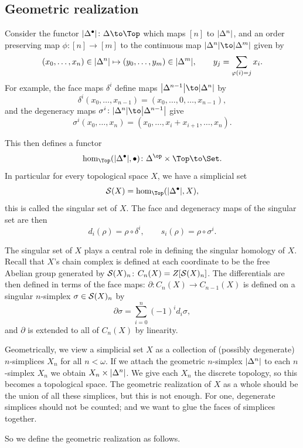 \subsection{Geometric realization}

Consider the functor $\abs{\Delta^\bul}\colon\Delta\to\Top$ which maps $[n]$ to $\abs{\Delta^n}$, and an order preserving map $\phi\colon[n]\to[m]$ to the continuous map
$\abs{\Delta^n}\to\abs{\Delta^m}$ given by
$$ (x_0,\dots,x_n)\in\abs{\Delta^n} \mapsto (y_0,\dots,y_m)\in\abs{\Delta^m},\qquad y_j = \sum_{\phi(i)=j}x_i . $$
For example, the face maps $\delta^i$ define maps $\abs{\Delta^{n-1}}\to\abs{\Delta^n}$ by
$$ \delta^i(x_0,\dots,x_{n-1}) = (x_0,\dots,0,\dots,x_{n-1}), $$
and the degeneracy maps $\sigma^i\colon\abs{\Delta^n}\to\abs{\Delta^{n-1}}$ give
$$ \sigma^i(x_0,\dots,x_n) = (x_0,\dots,x_i+x_{i+1},\dots,x_n) . $$

This then defines a functor
$$ \hom_\Top(\abs{\Delta^\bul},\bul) \colon \Delta^\op\times\Top \to \Set . $$
In particular for every topological space $X$, we have a simplicial set
$$ \S(X) = \hom_\Top(\abs{\Delta^\bul},X) , $$
this is called the {\emphcolor singular set} of $X$.
The face and degeneracy maps of the singular set are then
$$ d_i(\rho) = \rho\circ\delta^i,\qquad s_i(\rho) = \rho\circ\sigma^i . $$

\bnote

    The singular set of $X$ plays a central role in defining the singular homology of $X$.
    Recall that $X$'s chain complex is defined at each coordinate to be the free Abelian group generated by $\S(X)_n$: $C_n(X)=Z[\S(X)_n]$.
    The differentials are then defined in terms of the face maps: $\partial\colon C_n(X)\to C_{n-1}(X)$ is defined on a singular $n$-simplex $\sigma\in\S(X)_n$ by
    $$ \partial\sigma = \sum_{i=0}^n(-1)^id_i\sigma , $$
    and $\partial$ is extended to all of $C_n(X)$ by linearity.

\enote

Geometrically, we view a simplicial set $X$ as a collection of (possibly degenerate) $n$-simplices $X_n$ for all $n<\omega$.
If we attach the geometric $n$-simplex $\abs{\Delta^n}$ to each $n$-simplex $X_n$ we obtain $X_n\times\abs{\Delta^n}$.
We give each $X_n$ the discrete topology, so this becomes a topological space.
The geometric realization of $X$ as a whole should be the union of all these simplices, but this is not enough.
For one, degenerate simplices should not be counted; and we want to glue the faces of simplices together.

So we define the geometric realization as follows.

